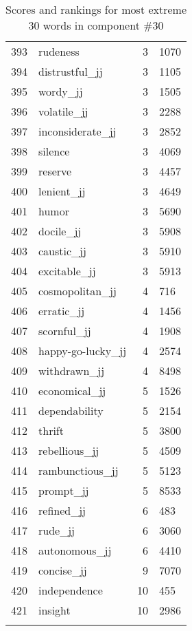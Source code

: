 \begin{longtable}[!htbp]{| rlr@{.}l |}
    393 & rudeness & 3 & 1070 \\
    394 & distrustful\_jj & 3 & 1105 \\
    395 & wordy\_jj & 3 & 1505 \\
    396 & volatile\_jj & 3 & 2288 \\
    397 & inconsiderate\_jj & 3 & 2852 \\
    398 & silence & 3 & 4069 \\
    399 & reserve & 3 & 4457 \\
    400 & lenient\_jj & 3 & 4649 \\
    401 & humor & 3 & 5690 \\
    402 & docile\_jj & 3 & 5908 \\
    403 & caustic\_jj & 3 & 5910 \\
    404 & excitable\_jj & 3 & 5913 \\
    405 & cosmopolitan\_jj & 4 & 716 \\
    406 & erratic\_jj & 4 & 1456 \\
    407 & scornful\_jj & 4 & 1908 \\
    408 & happy-go-lucky\_jj & 4 & 2574 \\
    409 & withdrawn\_jj & 4 & 8498 \\
    410 & economical\_jj & 5 & 1526 \\
    411 & dependability & 5 & 2154 \\
    412 & thrift & 5 & 3800 \\
    413 & rebellious\_jj & 5 & 4509 \\
    414 & rambunctious\_jj & 5 & 5123 \\
    415 & prompt\_jj & 5 & 8533 \\
    416 & refined\_jj & 6 & 483 \\
    417 & rude\_jj & 6 & 3060 \\
    418 & autonomous\_jj & 6 & 4410 \\
    419 & concise\_jj & 9 & 7070 \\
    420 & independence & 10 & 455 \\
    421 & insight & 10 & 2986 \\
    \hline
    \caption{Scores and rankings for most extreme 30 words in component \#30} \\
\end{longtable}
